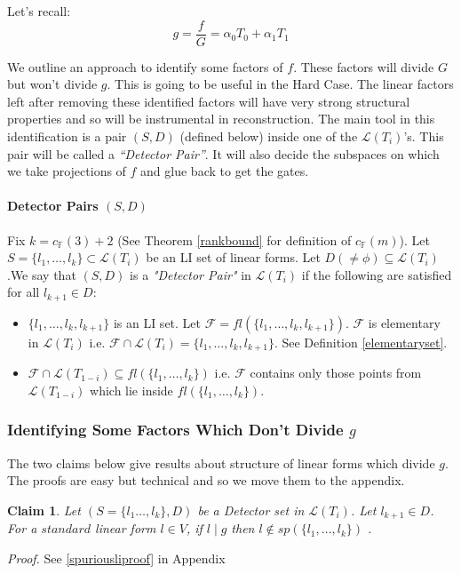 \documentclass[letterpaper,USenglish,numberwithinsect]{lipics}
\newcommand{\F}{\mathbb{F}}
\newcommand{\ML}{\mathcal{L}}
\newtheorem{claim}[theorem]{Claim}
\begin{document}
Let's recall:
\[
g = \frac{f}{G} = \alpha_0T_0+\alpha_1T_1
\]


We outline an approach to identify some factors of $f$. These factors will
divide $G$ but won't divide $g$. This is going to be useful in the Hard Case.
The linear factors left after removing these identified factors will have very
strong structural properties and so will be instrumental in reconstruction. The
main tool in this identification is a pair $(S,D)$ (defined below) inside one
of the $\ML(T_i)$'s. This pair will be called a \emph{``Detector Pair''}. It will
also decide the subspaces on which we take projections of $f$ and glue back to
get the gates.
\paragraph{Detector Pairs $(S,D)$ }\label{detectorset}
Fix $k=c_{\F}(3)+2$ (See Theorem \ref{rankbound} for definition of $c_\F(m)$). Let $S = \{l_{1},\ldots,l_{k}\} \subset \ML(T_i)$ be an LI
set of linear forms. Let $D(\neq \phi)\subseteq \ML(T_i)$ .We say that $(S,D)$
is a
\emph{"Detector Pair"} in $\ML(T_i)$ if the following are satisfied for all $l_{k+1}
\in D$:
\begin{itemize}
\item $\{l_{1},\ldots,l_{k},l_{k+1}\}$ is an LI set. Let $\mathcal{F} =
fl(\{l_{1},\ldots,l_{k},l_{k+1}\})$. $\mathcal{F}$ is elementary in $\ML(T_i)$
i.e.
$\mathcal{F}\cap \ML(T_i) = \{l_{1},\ldots,l_{k},l_{k+1}\}$. See
Definition \ref{elementaryset}.
\item $\mathcal{F}\cap \ML(T_{1-i}) \subseteq fl(\{l_{1},\ldots,l_{k}\})$ i.e.
$\mathcal{F}$  contains only those points from $\ML(T_{1-i})$ which lie inside
$fl(\{l_{1},\ldots,l_{k}\})$.
\end{itemize}




\subsubsection{Identifying Some Factors Which Don't Divide $g$}\label{identification}



The two claims below give results about structure of linear forms which
divide $g$. The proofs are easy but technical and so we move them to the
appendix.
\begin{claim} \label{spuriousli}
Let $(S = \{l_{1}\ldots, l_{k}\},D)$ be a Detector set in $\ML(T_i)$. Let
$l_{k+1}\in D$. For a $standard$ linear form $l\in V$, if $l\mid g$ then
$l\notin sp(\{l_{1},\ldots,l_{k}\})$ .
\end{claim}
\emph{Proof.}
See \ref{spuriousliproof} in Appendix
\end{document}
